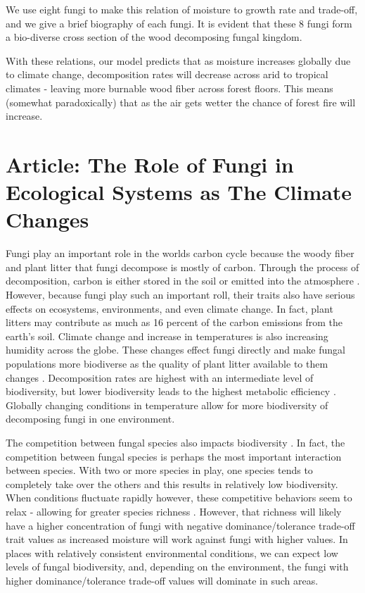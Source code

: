 \documentclass[12pt]{article}
\begin{document}
We use eight fungi to make this relation of moisture to growth rate and trade-off, and we give a brief biography of each fungi. It is evident that these 8 fungi form a bio-diverse cross section of the wood decomposing fungal kingdom. 

With these relations, our model predicts that as moisture increases globally due to climate change, decomposition rates will decrease across arid to tropical climates - leaving more burnable wood fiber across forest floors. This means (somewhat paradoxically) that as the air gets wetter the chance of forest fire will increase. 

\section{Article: The Role of Fungi in Ecological Systems as The Climate Changes}

Fungi play an important role in the worlds carbon cycle because the woody fiber and plant litter that fungi decompose is mostly of carbon. Through the process of decomposition, carbon is either stored in the soil or emitted into the atmosphere \cite{voriskova}. 
However, because fungi play such an important roll, their traits also have serious effects on ecosystems, environments, and even climate change. In fact, plant litters may contribute as much as 16 percent of the carbon emissions from the earth's soil. Climate change and increase in temperatures is also increasing humidity across the globe. These changes effect fungi directly and make fungal populations more biodiverse as the quality of plant litter available to them changes \cite{ivanov}. Decomposition rates are highest with an intermediate level of biodiversity, but lower biodiversity leads to the highest metabolic efficiency \cite{Toljander}. Globally changing conditions in temperature allow for more biodiversity of decomposing fungi in one environment. 

The competition between fungal species also impacts biodiversity \cite{Toljander}. In fact, the competition between fungal species is perhaps the most important interaction between species. With two or more species in play, one species tends to completely take over the others and this results in relatively low biodiversity. When conditions fluctuate rapidly however, these competitive behaviors seem to relax - allowing for greater species richness \cite{Toljander}. However, that richness will likely have a higher concentration of fungi with negative dominance/tolerance trade-off trait values as increased moisture will work against fungi with higher values. In places with relatively consistent environmental conditions, we can expect low levels of fungal biodiversity, and, depending on the environment, the fungi with higher dominance/tolerance trade-off values will dominate in such areas. 
\end{document}
